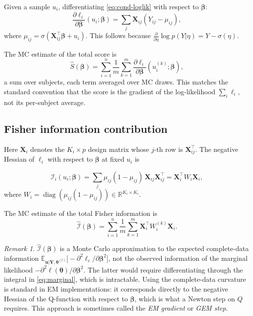\documentclass[11pt,a4paper]{article}
\theoremstyle{definition}
\theoremstyle{remark}
\newtheorem{remark}[theorem]{Remark}
\newcommand{\R}{\mathbb{R}}
\newcommand{\E}{\mathbb{E}}
\newcommand{\sig}{\sigma}           %
\newcommand{\bY}{\mathbf{Y}}
\newcommand{\bX}{\mathbf{X}}
\newcommand{\bu}{\mathbf{u}}
\newcommand{\bbeta}{\boldsymbol{\beta}}
\newcommand{\btheta}{\boldsymbol{\theta}}
\begin{document}
Given a sample $u_i$, differentiating \eqref{eq:cond-loglik} with respect to $\bbeta$:
\begin{equation}
  \frac{\partial \ell_i}{\partial \bbeta}(u_i;\bbeta)
    = \sum_j \bX_{ij}(Y_{ij} - \mu_{ij}),
  \label{eq:score}
\end{equation}
where $\mu_{ij} = \sig(\bX_{ij}^\top\bbeta + u_i)$.
This follows because
$\tfrac{\partial}{\partial\eta}\log p(Y|\eta) = Y - \sig(\eta)$.

The MC estimate of the total score is
\begin{equation}
  \hat{S}(\bbeta) = \sum_{i=1}^n
    \frac{1}{m}\sum_{k=1}^m \frac{\partial \ell_i}{\partial \bbeta}(u_i^{(k)};\bbeta),
\end{equation}
a sum over subjects, each term averaged over MC draws.  This matches the
standard convention that the score is the gradient of the log-likelihood
$\sum_i \ell_i$, not its per-subject average.

\subsection{Fisher information contribution}

Here $\bX_i$ denotes the $K_i \times p$ design matrix whose $j$-th row is
$\bX_{ij}^\top$.  The negative Hessian of $\ell_i$ with respect to $\bbeta$
at fixed $u_i$ is

\begin{equation}
  \mathcal{I}_i(u_i;\bbeta)
    = \sum_j \mu_{ij}(1-\mu_{ij})\,\bX_{ij}\bX_{ij}^\top
    = \bX_i^\top W_i \bX_i,
  \label{eq:fisher}
\end{equation}
where $W_i = \operatorname{diag}(\mu_{ij}(1-\mu_{ij})) \in \R^{K_i \times K_i}$.

The MC estimate of the total Fisher information is
\begin{equation}
  \hat{\mathcal{I}}(\bbeta) = \sum_{i=1}^n
    \frac{1}{m}\sum_{k=1}^m \bX_i^\top W_i^{(k)} \bX_i.
\end{equation}

\begin{remark}
$\hat{\mathcal{I}}(\bbeta)$ is a Monte Carlo approximation to the expected
complete-data information
$\E_{\bu|\bY,\btheta^{(t)}}\!\bigl[-\partial^2\ell_c/\partial\bbeta^2\bigr]$,
not the observed information of the marginal likelihood
$-\partial^2\ell(\btheta)/\partial\bbeta^2$.
The latter would require differentiating through the integral in
\eqref{eq:marginal}, which is intractable.  Using the complete-data curvature
is standard in EM implementations: it corresponds directly to the negative
Hessian of the Q-function with respect to $\bbeta$, which is what a
Newton step on $Q$ requires.  This approach is sometimes called the
\emph{EM gradient} or \emph{GEM step}.
\end{remark}
\end{document}
